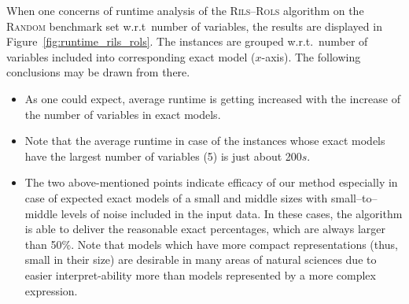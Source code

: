\documentclass[a4paper,12pt]{elsarticle}
\begin{document}
When one concerns of runtime analysis of the \textsc{Rils}--\textsc{Rols} algorithm on the \textsc{Random} benchmark set w.r.t\ number of variables, the results are displayed in Figure~\ref{fig:runtime_rils_rols}. The instances are grouped w.r.t.\ number of variables included into corresponding exact model ($x$-axis). The following conclusions may be drawn from there.  

\begin{itemize}
	\item As one could expect, average runtime is getting increased with the increase of the number of variables in exact models. 
	\item Note that the average runtime in case of the instances whose exact models have the largest number of variables (5) is just about 200$s$.
	\item The two above-mentioned points indicate efficacy of our method especially in case of expected exact models of a small and middle sizes with small--to--middle levels of noise included in the input data. In these cases, the algorithm is able to deliver the reasonable exact percentages, which are always larger than 50\%. Note that models which have more compact representations (thus, small in their size) are desirable in many areas of natural sciences due to easier interpret-ability more than models represented by a more complex expression.   
\end{itemize}
\end{document}
